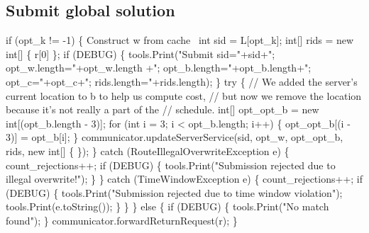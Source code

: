 \documentclass{article}
\def\nwendcode{\endtrivlist \endgroup}      %
\let\nwdocspar=\par
\begin{document}
\subsection{Submit global solution}
\nwenddocs{}\endmoddef{}
if (opt_k != -1) \{
  \LA{}Construct w from cache~{\nwtagstyle{}}\RA{}
  int sid = L[opt_k];
  int[] rids = new int[] \{ r[0] \};
  if (DEBUG) \{
    tools.Print("Submit sid="+sid+"; opt_w.length="+opt_w.length
      +"; opt_b.length="+opt_b.length+"; opt_c="+opt_c+"; rids.length="+rids.length);
  \}
  try \{
    // We added the server's current location to b to help us compute cost,
    // but now we remove the location because it's not really a part of the
    // schedule.
    int[] opt_opt_b = new int[(opt_b.length - 3)];
    for (int i = 3; i < opt_b.length; i++) \{
      opt_opt_b[(i - 3)] = opt_b[i];
    \}
    communicator.updateServerService(sid, opt_w, opt_opt_b, rids, new int[] \{ \});
  \} catch (RouteIllegalOverwriteException e) \{
    count_rejections++;
    if (DEBUG) \{
      tools.Print("Submission rejected due to illegal overwrite!");
    \}
  \} catch (TimeWindowException e) \{
    count_rejections++;
    if (DEBUG) \{
      tools.Print("Submission rejected due to time window violation");
      tools.Print(e.toString());
    \}
  \}
\} else \{
  if (DEBUG) \{
    tools.Print("No match found");
  \}
  communicator.forwardReturnRequest(r);
\}
\nwendcode{}\nwdocspar
\end{document}
